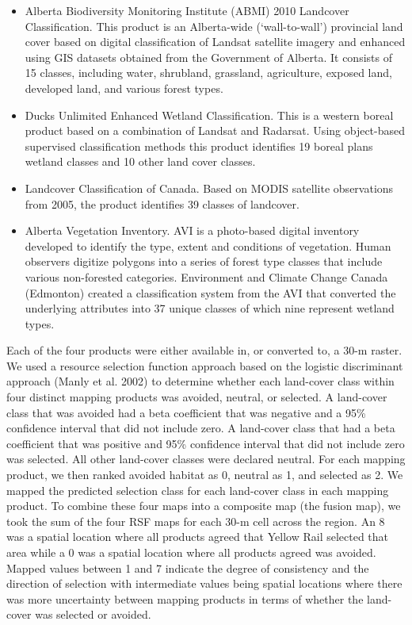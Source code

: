 \documentclass[11pt,]{article}
\providecommand{\tightlist}{%
  \setlength{\itemsep}{0pt}\setlength{\parskip}{0pt}}
\begin{document}
\begin{itemize}
\tightlist
\item
  Alberta Biodiversity Monitoring Institute (ABMI) 2010 Landcover
  Classification. This product is an Alberta-wide (`wall-to-wall')
  provincial land cover based on digital classification of Landsat
  satellite imagery and enhanced using GIS datasets obtained from the
  Government of Alberta. It consists of 15 classes, including water,
  shrubland, grassland, agriculture, exposed land, developed land, and
  various forest types.
\item
  Ducks Unlimited Enhanced Wetland Classification. This is a western
  boreal product based on a combination of Landsat and Radarsat. Using
  object-based supervised classification methods this product identifies
  19 boreal plans wetland classes and 10 other land cover classes.
\item
  Landcover Classification of Canada. Based on MODIS satellite
  observations from 2005, the product identifies 39 classes of
  landcover.
\item
  Alberta Vegetation Inventory. AVI is a photo-based digital inventory
  developed to identify the type, extent and conditions of vegetation.
  Human observers digitize polygons into a series of forest type classes
  that include various non-forested categories. Environment and Climate
  Change Canada (Edmonton) created a classification system from the AVI
  that converted the underlying attributes into 37 unique classes of
  which nine represent wetland types.
\end{itemize}

Each of the four products were either available in, or converted to, a
30-m raster. We used a resource selection function approach based on the
logistic discriminant approach (Manly et al. 2002) to determine whether
each land-cover class within four distinct mapping products was avoided,
neutral, or selected. A land-cover class that was avoided had a beta
coefficient that was negative and a 95\% confidence interval that did
not include zero. A land-cover class that had a beta coefficient that
was positive and 95\% confidence interval that did not include zero was
selected. All other land-cover classes were declared neutral. For each
mapping product, we then ranked avoided habitat as 0, neutral as 1, and
selected as 2. We mapped the predicted selection class for each
land-cover class in each mapping product. To combine these four maps
into a composite map (the fusion map), we took the sum of the four RSF
maps for each 30-m cell across the region. An 8 was a spatial location
where all products agreed that Yellow Rail selected that area while a 0
was a spatial location where all products agreed was avoided. Mapped
values between 1 and 7 indicate the degree of consistency and the
direction of selection with intermediate values being spatial locations
where there was more uncertainty between mapping products in terms of
whether the land-cover was selected or avoided.
\end{document}
